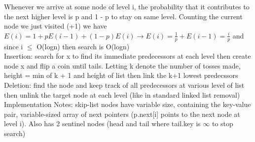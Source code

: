 \documentclass{article}
\begin{document}
  Whenever we arrive at some node of level i, the probability that it contributes to the next higher level is p and 1 - p to stay on same level. Counting the current node we just visited (+1) we have\\
  \indent $E(i) = 1 + pE(i-1) + (1-p)E(i) \rightarrow E(i) = \frac{1}{p} + E(i-1) = \frac{i}{p}$ and since i $\leq$ O(logn) then search is O(logn)\\
  Insertion: search for x to find its immediate predecessors at each level then create node x and flip a coin until tails. Letting k denote the number of tosses made, height = min of k + 1 and height of list then link the k+1 lowest predecssors \\
  Deletion: find the node and keep track of all predecessors at various level of list then unlink the target node at each level (like in standard linked list removal) \\
  Implementation Notes: skip-list nodes have variable size, containing the key-value pair, variable-sized array of next pointers (p.next[i] points to the next node at level i). Also has 2 sentinel nodes (head and tail where tail.key is $\infty$ to stop search)\\
  \newpage
\end{document}
